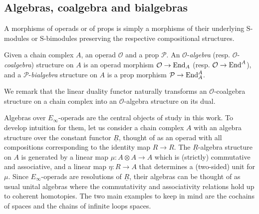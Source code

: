 \subsection{Algebras, coalgebra and bialgebras}

A morphisms of operads or of props is simply a morphisms of their underlying $\mathrm{S}$-modules or $\mathrm{S}$-bimodules preserving the respective compositional structures.

Given a chain complex $A$, an operad $\mathcal O$ and a prop $\mathcal P$.
An $\mathcal O$-\textit{algebra} (resp. $\mathcal O$-\textit{coalgebra}) structure on $A$ is an operad morphism $\mathcal O \to \mathrm{End}_A$ (resp. $\mathcal O \to \mathrm{End}^A$), and a $\mathcal P$-\textit{bialgebra} structure on $A$ is a prop morphism $\mathcal P \to \mathrm{End}_A^A$.

We remark that the linear duality functor naturally transforms an $\mathcal O$-coalgebra structure on a chain complex into an $\mathcal O$-algebra structure on its dual.

Algebras over $E_\infty$-operads are the central objects of study in this work.
To develop intuition for them, let us consider a chain complex $A$ with an algebra structure over the constant functor $\underline{R}$, thought of as an operad with all compositions corresponding to the identity map $R \to R$.
The $\underline{R}$-algebra structure on $A$ is generated by a linear map $\mu \colon A \otimes A \to A$ which is (strictly) commutative and associative, and a linear map $\eta \colon R \to A$ that determines a (two-sided) unit for $\mu$.
Since $E_\infty$-operads are resolutions of $\underline{R}$, their algebras can be thought of as usual unital algebras where the commutativity and associativity relations hold up to coherent homotopies.
The two main examples to keep in mind are the cochains of spaces and the chains of infinite loops spaces.	
